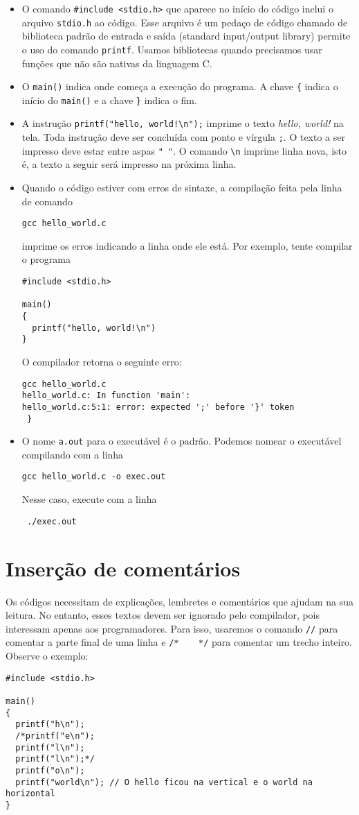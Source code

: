 \begin{itemize}
 \item O comando \verb|#include <stdio.h>| que aparece no início do código inclui o arquivo \verb|stdio.h| ao código. Esse arquivo é um pedaço de código chamado de biblioteca padrão de entrada e saída (standard input/output library) permite o uso do comando \verb|printf|. Usamos bibliotecas quando precisamos usar funções que não são nativas da linguagem C.
 \item O \verb|main()| indica onde começa a execução do programa. A chave \verb|{| indica o início do \verb|main()| e a chave \verb|}| indica o fim. 
 \item A instrução \verb|printf("hello, world!\n");| imprime o texto {\it hello, world!} na tela. Toda instrução deve ser concluída com ponto e vírgula \verb|;|. O texto a ser impresso deve estar entre aspas \verb|" "|. O comando \verb|\n| imprime linha nova, isto é, a texto a seguir será impresso na próxima linha.
 \item Quando o código estiver com erros de sintaxe, a compilação feita pela linha de comando 
\begin{verbatim}
gcc hello_world.c
\end{verbatim}
imprime os erros indicando a linha onde ele está. Por exemplo, tente compilar o programa
 \begin{verbatim}
#include <stdio.h>

main()
{
  printf("hello, world!\n")
}
\end{verbatim}
O compilador retorna o seguinte erro:
\begin{verbatim}
gcc hello_world.c 
hello_world.c: In function 'main':
hello_world.c:5:1: error: expected ';' before '}' token
 }
\end{verbatim}

\item O nome \verb|a.out| para o executável é o padrão. Podemos nomear o executável compilando com a linha 
\begin{verbatim}
gcc hello_world.c -o exec.out 
\end{verbatim}
Nesse caso, execute com a linha 
\begin{verbatim}
 ./exec.out
\end{verbatim} 
\end{itemize}

\section{Inserção de comentários}
Os códigos necessitam de explicações, lembretes e comentários que ajudam na sua leitura. No entanto, esses textos devem ser ignorado pelo compilador, pois interessam apenas aos programadores. Para isso, usaremos o comando \verb|//| para comentar a parte final de uma linha e \verb|/*    */| para comentar um trecho inteiro. Observe o exemplo:
 \begin{verbatim}
#include <stdio.h>

main()
{
  printf("h\n");
  /*printf("e\n");
  printf("l\n");
  printf("l\n");*/
  printf("o\n");
  printf("world\n"); // O hello ficou na vertical e o world na horizontal
}
\end{verbatim}

